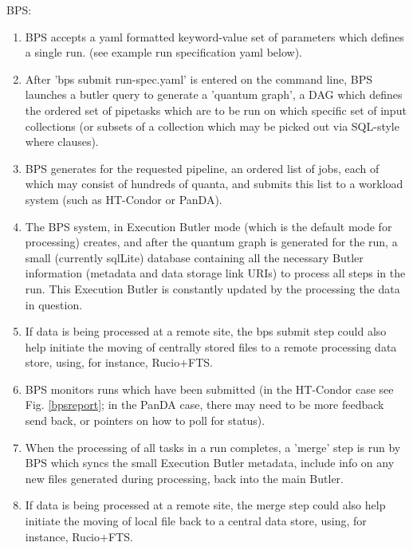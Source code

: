 \documentclass[DM,authoryear,toc]{lsstdoc}
\begin{document}
BPS:
\begin{enumerate}

\item BPS accepts a yaml formatted keyword-value set of parameters which
defines a single run. (see example run specification yaml below).

\item After 'bps submit run-spec.yaml' is entered on the command line, 
BPS launches a butler query to 
generate a 'quantum graph', a DAG which defines the ordered set of 
pipetasks which are to be run on which specific set of input 
collections (or subsets of a collection which may be picked out via SQL-style
where clauses).  

\item BPS generates for the requested pipeline, an ordered list of jobs, 
each of which may consist of hundreds of quanta, and submits this 
list to a workload system (such as HT-Condor or PanDA).

\item The BPS system, in Execution Butler mode (which is the default mode for processing) creates, 
and after the quantum graph is generated for the run, a small (currently sqlLite) database 
containing all the necessary Butler information (metadata and data storage link URIs) to process 
all steps in the run.  This Execution Butler is constantly updated by the processing the data in question.

\item If data is being processed at a remote site, 
the bps submit step could also help initiate the moving of centrally stored files to a remote processing
data store, using, for instance, Rucio+FTS.

\item BPS monitors runs which have been submitted  (in the HT-Condor case 
see Fig. \ref{bpsreport};  in the PanDA case, there may need to be more
feedback send back, or pointers on how to poll for status).

\item When the processing of all tasks in a run completes, a 'merge' step is run by BPS which syncs the 
small Execution Butler metadata, include info on any new files generated during processing,
back into the main Butler.  

\item If data is being processed at a remote site, 
the merge step could also help initiate the moving of local file back to a central
data store, using, for instance, Rucio+FTS.


\end{enumerate}
\end{document}

